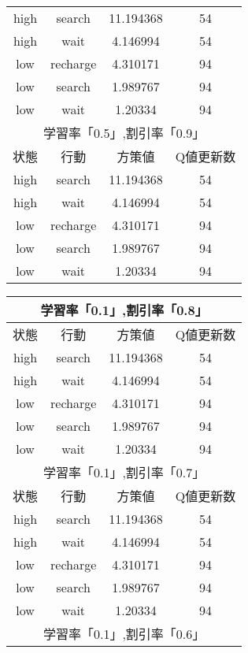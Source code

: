 \begin{table}
\begin{minipage}[t]{0.45\hsize}
\begin{tabular}{|c|c|c|c|}
      \hline
      high & search & 11.194368 & 54 \\
      high & wait & 4.146994 & 54 \\
      low & recharge & 4.310171 & 94 \\
      low & search & 1.989767 & 94 \\
      low & wait & 1.20334 & 94 \\
      \hline\hline
      \multicolumn{4}{|c|}{学習率「0.5」,割引率「0.9」} \\
      \hline
      状態 & 行動 & 方策値 & Q値更新数\\
      \hline
      high & search & 11.194368 & 54 \\
      high & wait & 4.146994 & 54 \\
      low & recharge & 4.310171 & 94 \\
      low & search & 1.989767 & 94 \\
      low & wait & 1.20334 & 94 \\
      \hline
    \end{tabular}
  \end{minipage}
  \begin{minipage}[r]{0.45\hsize}
    \begin{tabular}{|c|c|c|c|}
      \hline
      \multicolumn{4}{|c|}{学習率「0.1」,割引率「0.8」} \\
      \hline
      状態 & 行動 & 方策値 & Q値更新数\\
      \hline
      high & search & 11.194368 & 54 \\
      high & wait & 4.146994 & 54 \\
      low & recharge & 4.310171 & 94 \\
      low & search & 1.989767 & 94 \\
      low & wait & 1.20334 & 94 \\
      \hline\hline
      \multicolumn{4}{|c|}{学習率「0.1」,割引率「0.7」} \\
      \hline
      状態 & 行動 & 方策値 & Q値更新数\\
      \hline
      high & search & 11.194368 & 54 \\
      high & wait & 4.146994 & 54 \\
      low & recharge & 4.310171 & 94 \\
      low & search & 1.989767 & 94 \\
      low & wait & 1.20334 & 94 \\
      \hline\hline
      \multicolumn{4}{|c|}{学習率「0.1」,割引率「0.6」} \\

\end{tabular}
\end{minipage}
\end{table}
